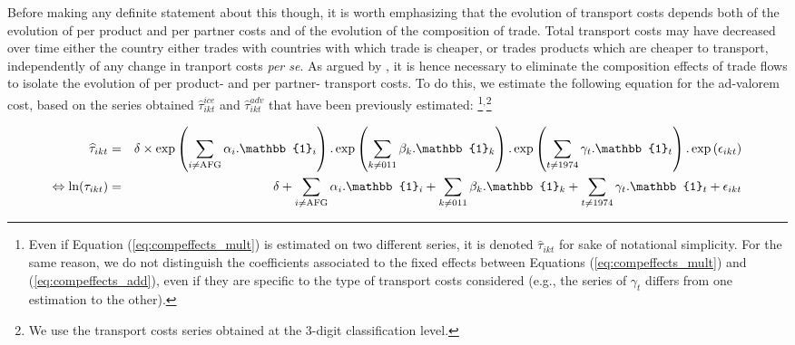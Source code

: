 \documentclass[a4paper,11pt]{article}
\begin{document}
Before making any definite statement about this though, it is worth emphasizing that the evolution of transport costs depends both of the evolution of per product and per partner costs and of the evolution of the composition of trade.
Total transport costs may have decreased over time either the country either trades with countries with which trade is cheaper, or trades products which are cheaper to transport, independently of any change in tranport costs \textit{per se}. As argued by \citet{hummels2007}, it is hence necessary to eliminate the composition effects of trade flows to isolate the evolution of per product- and per partner- transport costs. To do this, we estimate the following equation for the ad-valorem cost, based on the series obtained $\widehat{\tau}_{ikt}^{ice}$ and $\widehat{\tau}_{ikt}^{adv}$ that have been previously estimated:
\footnote{Even if Equation (\ref{eq:compeffects_mult}) is estimated on two different series, it is denoted $\widehat{\tau}_{ikt}$ for sake of notational simplicity. For the same reason, we do not distinguish the coefficients associated to the fixed effects between Equations (\ref{eq:compeffects_mult}) and (\ref{eq:compeffects_add}), even if they are specific to the type of transport costs considered (e.g., the series of $\gamma_t$ differs from one estimation to the other).}$^{,}$\footnote{We use the transport costs series obtained at the 3-digit classification level.}

\begin{eqnarray}
\widehat{\tau}_{ikt}&=&\delta\times \exp\left(\sum_{i \neq \text{AFG}}\alpha_i.\mathbb{1}_i\right).\exp\left(\sum_{k\neq \text{011}}\beta_k.\mathbb{1}_k\right).\exp\left(\sum_{t \neq 1974}\gamma_t.\mathbb{1}_t\right) .\exp\left(\epsilon_{ikt}\right) \notag \\
\Leftrightarrow \ln(\tau_{ikt})&=&\delta +\sum_{i \neq \text{AFG}}\alpha_i.\mathbb{1}_i + \sum_{k\neq \text{011}}\beta_k.\mathbb{1}_k + \sum_{t \neq 1974}\gamma_t.\mathbb{1}_t+\epsilon_{ikt} \label{eq:compeffects_mult}
\end{eqnarray}
\end{document}
